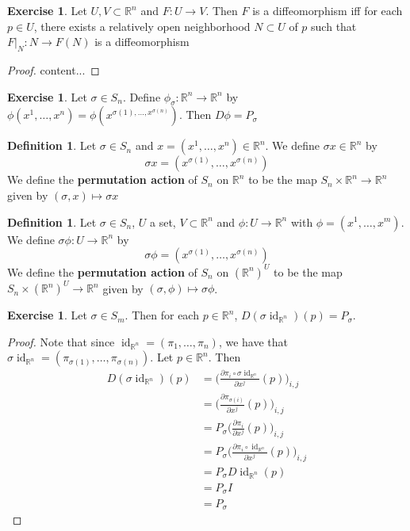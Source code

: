 \documentclass{book}
\theoremstyle{definition}
\newtheorem{defn}[definition]{Definition}
\newtheorem{ex}[definition]{Exercise}
\newcommand{\sig}{\sigma}
\newcommand{\R}{\mathbb{R}}
\DeclareMathOperator{\id}{id}
\DeclareMathOperator*{\0}{\mbf{0}}
\DeclareMathOperator*{\1}{\mbf{1}}
\newcommand{\tbf}[1]{\textbf{#1}}
\newcommand{\p}{\partial}
\begin{document}
	\begin{ex}
		Let $U,V \subset \R^n$ and $F: U \rightarrow V$. Then $F$ is a diffeomorphism iff for each $p \in U$, there exists a relatively open neighborhood $N \subset U$ of $p$ such that $F|_N:N \rightarrow F(N)$ is a diffeomorphism
	\end{ex}
	
	\begin{proof}
		content...
	\end{proof}

	\begin{ex}
		Let $\sig \in S_n$. Define $\phi_{\sig}: \R^n \rightarrow \R^n$ by $\phi(x^1, \ldots, x^n) = \phi(x^{\sig(1), \ldots, x^{\sig(n)}})$. Then $D \phi = P_{\sig}$
	\end{ex}

	\begin{defn}
		Let $\sig \in S_n$ and $x = (x^1, \ldots, x^n) \in \R^n$. We define $\sig x \in \R^n$ by 
		$$\sig x = (x^{\sig(1)}, \ldots, x^{\sig(n)})$$
		We define the \tbf{permutation action} of $S_n$ on $\R^n$ to be the map $S_n \times \R^n \rightarrow \R^n$ given by $(\sig, x) \mapsto \sig x$
	\end{defn}

	\begin{defn}
		Let $\sig \in S_n$, $U$ a set, $V \subset \R^n$ and $\phi: U \rightarrow \R^n$ with $\phi = (x^1, \ldots, x^m)$. We define $\sig \phi: U \rightarrow \R^n$ by 
		$$\sig \phi = (x^{\sig(1)}, \ldots, x^{\sig(n)})$$
		We define the \tbf{permutation action} of $S_n$ on $(\R^n)^{U}$ to be the map $S_n \times (\R^n)^{U} \rightarrow \R^n$ given by $(\sig, \phi) \mapsto \sig \phi$.
	\end{defn}

	\begin{ex}
		Let $\sig \in S_m$. Then for each $p \in \R^n$, $D(\sig \id_{\R^n})(p) = P_{\sig}$. 
	\end{ex}

	\begin{proof}
		Note that since $\id_{\R^n} = (\pi_1, \ldots, \pi_n)$, we have that $\sig \id_{\R^n} = (\pi_{\sig(1)}, \ldots, \pi_{\sig(n)})$. Let $p \in \R^n$. Then 
		\begin{align*}
			D(\sig \id_{\R^n})(p) 
			& = \bigg( \frac{\p  \pi_{i} \circ \sig \id_{\R^n}}{\p x^j}(p) \bigg)_{i,j} \\
			& = \bigg( \frac{\p \pi_{\sig(i)}}{\p x^j}(p) \bigg)_{i,j} \\
			& = P_{\sig} \bigg( \frac{\p \pi_{i}}{\p x^j}(p) \bigg)_{i,j} \\
			& = P_{\sig} \bigg( \frac{\p \pi_{i} \circ \id_{\R^n} }{\p x^j}(p) \bigg)_{i,j} \\
			& = P_{\sig} D \id_{\R^n}(p) \\
			& = P_{\sig} I \\
			& = P_{\sig}
		\end{align*} 
	\end{proof}
\end{document}
